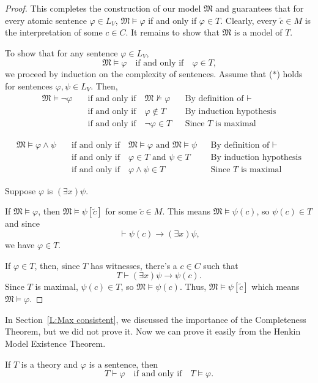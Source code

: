 \documentclass{scrartcl}
\renewcommand{\phi}{\varphi}
\newcommand{\FM}{\mathfrak{M}}
\begin{document}
\begin{proof}
This completes the construction of our model $\FM$ and guarantees that for every atomic sentence $\phi\in L_V$, $\FM\models\phi$ if and only if $\phi\in T$. Clearly, every $\tilde{c}\in M$ is the interpretation of some $c\in C$. It remains to show that $\FM$ is a model of $T$.

To show that for any sentence $\phi\in L_V$,
\[ \FM \models \phi \quad \text{if and only if} \quad \phi\in T\text{,} \tag{$*$}
\]
we proceed by induction on the complexity of sentences. Assume that ($*$) holds for sentences $\phi,\psi\in L_V$. Then,
\begin{align*}
\FM \models \neg\phi \quad & \text{if and only if} \quad \FM \not \models \phi &&\text{By definition of $\vdash$}\\
&\text{if and only if} \quad \phi \not \in T &&\text{By induction hypothesis}\\
&\text{if and only if} \quad  \neg\phi\in T &&\text{Since $T$ is maximal}
\end{align*}


\begin{align*}
\FM \models \phi \wedge \psi \quad & \text{if and only if} \quad \FM\models \phi \text{ and } \FM \models \psi &&\text{By definition of $\vdash$}\\
&\text{if and only if} \quad  \phi\in T \text{ and } \psi\in T  &&\text{By induction hypothesis}\\
&\text{if and only if} \quad  \phi\wedge\psi\in T   &&\text{Since $T$ is maximal}
\end{align*}

Suppose $\phi$ is $(\exists x)\psi$.

If $\FM \models\phi$, then $\FM \models \psi[\tilde{c}]$ for some $\tilde{c}\in M$. This means $\FM\models\psi(c)$, so $\psi(c)\in T$ and since 
\[
\vdash \psi(c)\rightarrow (\exists x)\psi\text{,}
\]
we have $\phi\in T$.

If $\phi\in T$, then, since $T$ has witnesses, there's a $c\in C$ such that
\[
T\vdash (\exists x)\psi\rightarrow\psi(c)\text{.}
\]
Since $T$ is maximal, $\psi(c)\in T$, so $\FM \models \psi(c)$. Thus, $\FM \models \psi[\tilde{c}]$ which means $\FM\models \phi$.
\end{proof}

In Section~\ref{L:Max consistent}, we discussed the importance of the Completeness Theorem, but we did not prove it. 
Now we can prove it easily from the Henkin Model Existence Theorem.

\begin{theorem} 
\label{T:completeness}

If $T$ is a theory and $\phi$ is a sentence, then
\[
T\vdash \phi
\quad\text{if and only if}\quad
T\models\phi.
\]
\end{theorem}
\end{document}
